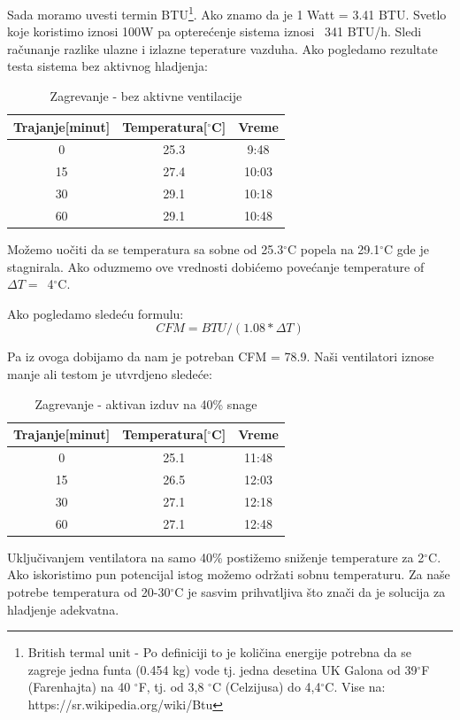 \documentclass[a4paper,11pt]{book}
\begin{document}
Sada moramo uvesti termin BTU\footnote{British termal unit - Po definiciji to je količina energije potrebna da se zagreje jedna funta (0.454 kg) vode tj. jedna desetina UK Galona od 39$^\circ$F (Farenhajta) na 40 $^\circ$F, tj. od 3,8 $^\circ$C (Celzijusa) do 4,4$^\circ$C. Vise na: https://sr.wikipedia.org/wiki/Btu}. Ako znamo da je 1 Watt = 3.41 BTU. Svetlo koje koristimo iznosi 100W pa opterećenje sistema iznosi ~341 BTU/h. Sledi računanje razlike ulazne i izlazne teperature vazduha. Ako pogledamo rezultate testa sistema bez aktivnog hladjenja:


\begin{table}[ht]
  \caption{Zagrevanje - bez aktivne ventilacije}
  \centering
  \begin{tabular}{|c|c|c|}
  \hline
    Trajanje[minut] & Temperatura[$^\circ$C] & Vreme\\ \hline
  0 & 25.3 & 9:48 \\ \hline
  15 & 27.4 & 10:03 \\ \hline
  30 & 29.1 & 10:18 \\ \hline
  60 & 29.1 & 10:48 \\ \hline
  \end{tabular}
\end{table}

Možemo uočiti da se temperatura sa sobne od 25.3$^\circ$C popela na 29.1$^\circ$C gde je stagnirala. Ako oduzmemo ove vrednosti dobićemo povećanje temperature of $\Delta T =$~4$^\circ$C.

Ako pogledamo sledeću formulu: 
\[ CFM = BTU / (1.08 * \Delta T)\]

Pa iz ovoga dobijamo da nam je potreban CFM = 78.9. Naši ventilatori iznose manje ali testom je utvrdjeno sledeće:\\

\begin{table}[ht]
  \caption{Zagrevanje - aktivan izduv na 40\% snage}
  \centering
  \begin{tabular}{|c|c|c|}
  \hline
    Trajanje[minut] & Temperatura[$^\circ$C] & Vreme\\ \hline
  0 & 25.1 & 11:48 \\ \hline
  15 & 26.5 & 12:03 \\ \hline
  30 & 27.1 & 12:18 \\ \hline
  60 & 27.1 & 12:48 \\ \hline
  \end{tabular}
\end{table}

Uključivanjem ventilatora na samo 40\% postižemo sniženje temperature za 2$^\circ$C. Ako iskoristimo pun potencijal istog možemo održati sobnu temperaturu.
Za naše potrebe temperatura od 20-30$^\circ$C je sasvim prihvatljiva što znači da je solucija za hladjenje adekvatna.
\end{document}
